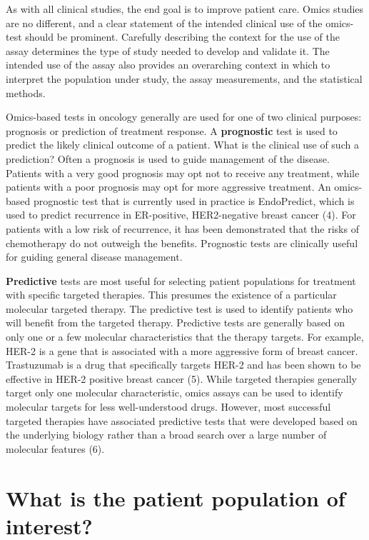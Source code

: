\documentclass[11pt]{article}
\begin{document}
As with all clinical studies, the end goal is to improve patient care.
Omics studies are no different, and a clear statement of the intended
clinical use of the omics-test should be prominent. Carefully describing
the context for the use of the assay determines the type of study needed
to develop and validate it. The intended use of the assay also provides
an overarching context in which to interpret the population under study,
the assay measurements, and the statistical methods.

Omics-based tests in oncology generally are used for one of two clinical
purposes: prognosis or prediction of treatment response. A
\textbf{prognostic} test is used to predict the likely clinical outcome
of a patient. What is the clinical use of such a prediction? Often a
prognosis is used to guide management of the disease. Patients with a
very good prognosis may opt not to receive any treatment, while patients
with a poor prognosis may opt for more aggressive treatment. An
omics-based prognostic test that is currently used in practice is
EndoPredict, which is used to predict recurrence in ER-positive,
HER2-negative breast cancer (4). For patients with a low risk of
recurrence, it has been demonstrated that the risks of chemotherapy do
not outweigh the benefits. Prognostic tests are clinically useful for
guiding general disease management.

\textbf{Predictive} tests are most useful for selecting patient
populations for treatment with specific targeted therapies. This
presumes the existence of a particular molecular targeted therapy. The
predictive test is used to identify patients who will benefit from the
targeted therapy. Predictive tests are generally based on only one or a
few molecular characteristics that the therapy targets. For example,
HER-2 is a gene that is associated with a more aggressive form of breast
cancer. Trastuzumab is a drug that specifically targets HER-2 and has
been shown to be effective in HER-2 positive breast cancer (5). While
targeted therapies generally target only one molecular characteristic,
omics assays can be used to identify molecular targets for less
well-understood drugs. However, most successful targeted therapies have
associated predictive tests that were developed based on the underlying
biology rather than a broad search over a large number of molecular
features (6).

\section{What is the patient population of
interest?}\label{what-is-the-patient-population-of-interest}
\end{document}
